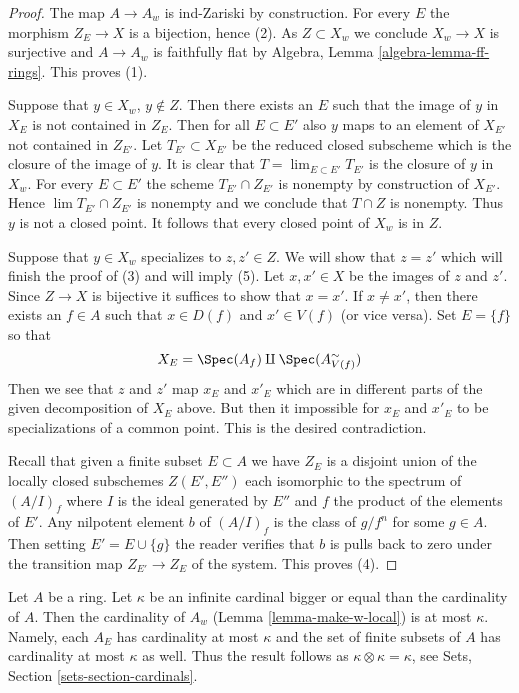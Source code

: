 \begin{proof}
The map $A \to A_w$ is ind-Zariski by construction.
For every $E$ the morphism $Z_E \to X$ is a bijection, hence (2).
As $Z \subset X_w$ we conclude $X_w \to X$ is surjective and
$A \to A_w$ is faithfully flat by
Algebra, Lemma \ref{algebra-lemma-ff-rings}. This proves (1).

\medskip\noindent
Suppose that $y \in X_w$, $y \not \in Z$. Then there
exists an $E$ such that the image of $y$ in $X_E$ is not contained in
$Z_E$. Then for all $E \subset E'$ also $y$ maps to an element of $X_{E'}$
not contained in $Z_{E'}$. Let $T_{E'} \subset X_{E'}$ be the reduced
closed subscheme which is the closure of the image of $y$. It is
clear that $T = \lim_{E \subset E'} T_{E'}$ is the closure of $y$ in $X_w$.
For every $E \subset E'$ the scheme $T_{E'} \cap Z_{E'}$ is nonempty
by construction of $X_{E'}$. Hence $\lim T_{E'} \cap Z_{E'}$ is nonempty
and we conclude that $T \cap Z$ is nonempty. Thus $y$ is not a closed point.
It follows that every closed point of $X_w$ is in $Z$.

\medskip\noindent
Suppose that $y \in X_w$ specializes to $z, z' \in Z$. We will show that
$z = z'$ which will finish the proof of (3) and will imply (5).
Let $x, x' \in X$ be the images of $z$ and $z'$. Since $Z \to X$ is
bijective it suffices to show that $x = x'$. If $x \not = x'$, then
there exists an $f \in A$ such that $x \in D(f)$ and $x' \in V(f)$
(or vice versa). Set $E = \{f\}$ so that
$$
X_E = \Spec(A_f) \amalg \Spec(A_{V(f)}^\sim)
$$
Then we see that $z$ and $z'$ map $x_E$ and $x'_E$ which are in different
parts of the given decomposition of $X_E$ above. But then it impossible
for $x_E$ and $x'_E$ to be specializations of a common point.
This is the desired contradiction.

\medskip\noindent
Recall that given a finite subset $E \subset A$ we have $Z_E$
is a disjoint union of the locally closed subschemes $Z(E', E'')$
each isomorphic to the spectrum of $(A/I)_f$ where $I$ is the ideal
generated by $E''$ and $f$ the product of the elements of $E'$.
Any nilpotent element $b$ of $(A/I)_f$ is the class of $g/f^n$
for some $g \in A$. Then setting $E' = E \cup \{g\}$ the reader
verifies that $b$ is pulls back to zero under the transition map
$Z_{E'} \to Z_E$ of the system. This proves (4).
\end{proof}

\begin{remark}
\label{remark-size-w}
Let $A$ be a ring. Let $\kappa$ be an infinite cardinal bigger or
equal than the cardinality of $A$. Then the cardinality of $A_w$
(Lemma \ref{lemma-make-w-local})
is at most $\kappa$. Namely, each $A_E$ has cardinality at most
$\kappa$ and the set of finite subsets of $A$ has cardinality at most $\kappa$
as well. Thus the result follows as $\kappa \otimes \kappa = \kappa$, see
Sets, Section \ref{sets-section-cardinals}.
\end{remark}

